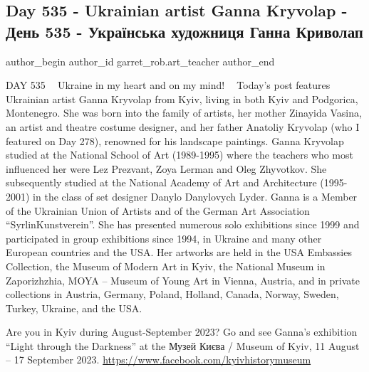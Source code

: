  
 
 
 
 

\subsection{Day 535 - Ukrainian artist Ganna Kryvolap - День 535 - Українська художниця Ганна Криволап}
\label{sec:12_08_2023.fb.garret_rob.art_teacher.1.ukrainian_artist_ganna_kryvolap}

\ifcmt
 author_begin
   author_id garret_rob.art_teacher
 author_end
\fi

DAY 535 💙💛 Ukraine in my heart and on my mind! 💙💛 Today's post features
Ukrainian artist Ganna Kryvolap from Kyiv, living in both Kyiv and Podgorica,
Montenegro. She was born into the family of artists, her mother Zinayida
Vasina, an artist and theatre costume designer, and her father Anatoliy
Kryvolap (who I featured on Day 278), renowned for his landscape paintings.
Ganna Kryvolap studied at the National School of Art (1989-1995) where the
teachers who most influenced her were Lez Prezvant, Zoya Lerman and Oleg
Zhyvotkov. She subsequently studied at the National Academy of Art and
Architecture (1995-2001) in the class of set designer Danylo Danylovych Lyder.
Ganna is a Member of the Ukrainian Union of Artists and of the German Art
Association \enquote{SyrlinKunstverein}. She has presented numerous solo exhibitions
since 1999 and participated in group exhibitions since 1994, in Ukraine and
many other European countries and the USA. Her artworks are held in the USA
Embassies Collection, the Museum of Modern Art in Kyiv, the National Museum in
Zaporizhzhia, MOYA – Museum of Young Art in Vienna, Austria, and in private
collections in Austria, Germany, Poland, Holland, Canada, Norway, Sweden,
Turkey, Ukraine, and the USA.

Are you in Kyiv during August-September 2023? Go and see Ganna's exhibition
\enquote{Light through the Darkness} at the Музей Києва / Museum of Kyiv, 11 August –
17 September 2023. \url{https://www.facebook.com/kyivhistorymuseum} 

